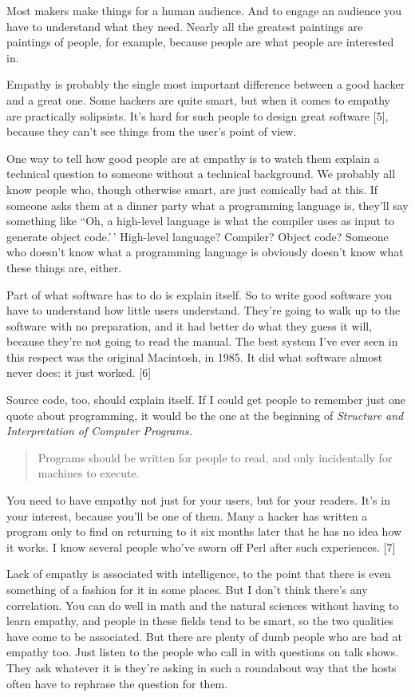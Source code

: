 Most makers make things for a human audience. And to engage an audience
you have to understand what they need. Nearly all the greatest paintings
are paintings of people, for example, because people are what people are
interested in.

Empathy is probably the single most important difference between a good
hacker and a great one. Some hackers are quite smart, but when it comes
to empathy are practically solipsists. It's hard for such people to
design great software {[}5{]}, because they can't see things from the
user's point of view.

One way to tell how good people are at empathy is to watch them explain
a technical question to someone without a technical background. We
probably all know people who, though otherwise smart, are just comically
bad at this. If someone asks them at a dinner party what a programming
language is, they'll say something like ``Oh, a high-level language is
what the compiler uses as input to generate object code.'\,' High-level
language? Compiler? Object code? Someone who doesn't know what a
programming language is obviously doesn't know what these things are,
either.

Part of what software has to do is explain itself. So to write good
software you have to understand how little users understand. They're
going to walk up to the software with no preparation, and it had better
do what they guess it will, because they're not going to read the
manual. The best system I've ever seen in this respect was the original
Macintosh, in 1985. It did what software almost never does: it just
worked. {[}6{]}

Source code, too, should explain itself. If I could get people to
remember just one quote about programming, it would be the one at the
beginning of \emph{Structure and Interpretation of Computer Programs.}

\begin{quote}
Programs should be written for people to read, and only incidentally for
machines to execute.
\end{quote}

You need to have empathy not just for your users, but for your readers.
It's in your interest, because you'll be one of them. Many a hacker has
written a program only to find on returning to it six months later that
he has no idea how it works. I know several people who've sworn off Perl
after such experiences. {[}7{]}

Lack of empathy is associated with intelligence, to the point that there
is even something of a fashion for it in some places. But I don't think
there's any correlation. You can do well in math and the natural
sciences without having to learn empathy, and people in these fields
tend to be smart, so the two qualities have come to be associated. But
there are plenty of dumb people who are bad at empathy too. Just listen
to the people who call in with questions on talk shows. They ask
whatever it is they're asking in such a roundabout way that the hosts
often have to rephrase the question for them.

